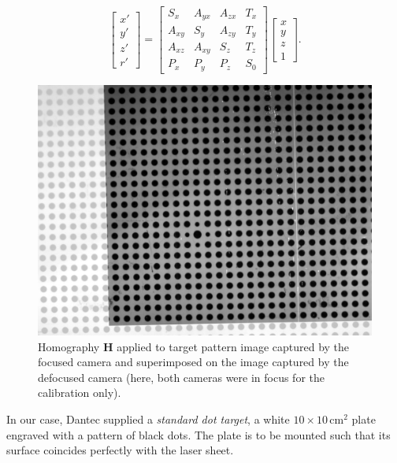 \documentclass[11.5pt,oneside]{book}
\begin{document}
\begin{equation}
\left[\begin{array}{c} x'\\ y'\\ z'\\ r' \end{array} \right]
=
\left[ \begin{array}{cccc}
S_x & A_{yx} & A_{zx} & T_x \\
A_{xy} & S_y & A_{zy} & T_y \\
A_{xz} & A_{xy} & S_z & T_z \\
P_x & P_y & P_z & S_0
\end{array} \right]
\left[ \begin{array}{c} x\\ y \\ z \\ 1 \end{array} \right].
\end{equation}
\begin{figure}
    \centering
    \includegraphics[height=0.45\textheight]{img/orb/plate-calibration.jpg}
    \caption{Homography $\mathbf{H}$ applied to target pattern image captured by
        the focused camera and superimposed on the image captured by the
        defocused camera (here, both cameras were in focus for the calibration
        only).
    \label{fig:plate-calibration}}
\end{figure}

In our case, Dantec supplied a \emph{standard dot target}, a white $10 \times 10\,
\mathrm{cm}^2$ plate engraved with a pattern of black dots. The plate is to be
mounted such that its surface coincides perfectly with the laser sheet. 
\end{document}
